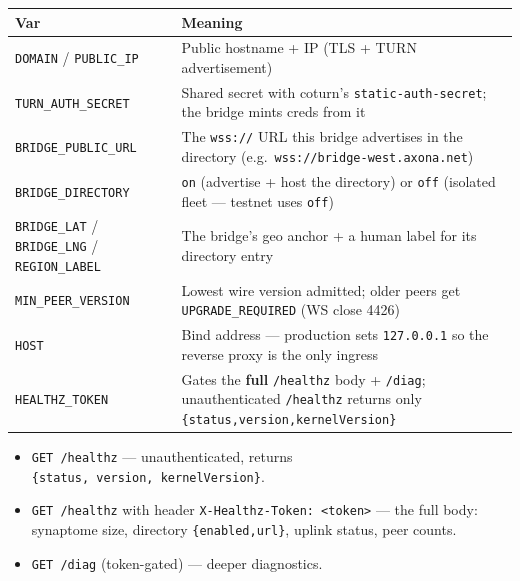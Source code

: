 \documentclass[
  nobib]{tufte-handout}
\newcounter{none} %
\providecommand{\tightlist}{%
  \setlength{\itemsep}{0pt}\setlength{\parskip}{0pt}}
\renewcommand{\subsubsection}[1]{\medskip\par\noindent{\normalsize\bfseries #1}\par\nobreak\smallskip}
\begin{document}
{\def\LTcaptype{none} %
\begin{longtable}[]{@{}
  >{\raggedright\arraybackslash}p{}
  >{\raggedright\arraybackslash}p{}@{}}
\toprule\noalign{}
\begin{minipage}[b]{\linewidth}\raggedright
Var
\end{minipage} & \begin{minipage}[b]{\linewidth}\raggedright
Meaning
\end{minipage} \\
\midrule\noalign{}
\endhead
\bottomrule\noalign{}
\endlastfoot
\texttt{DOMAIN} / \texttt{PUBLIC\_IP} & Public hostname + IP (TLS + TURN
advertisement) \\
\texttt{TURN\_AUTH\_SECRET} & Shared secret with coturn's
\texttt{static-auth-secret}; the bridge mints creds from it \\
\texttt{BRIDGE\_PUBLIC\_URL} & The \texttt{wss://} URL this bridge
advertises in the directory
(e.g.~\texttt{wss://bridge-west.axona.net}) \\
\texttt{BRIDGE\_DIRECTORY} & \texttt{on} (advertise + host the
directory) or \texttt{off} (isolated fleet --- testnet uses
\texttt{off}) \\
\texttt{BRIDGE\_LAT} / \texttt{BRIDGE\_LNG} / \texttt{REGION\_LABEL} &
The bridge's geo anchor + a human label for its directory entry \\
\texttt{MIN\_PEER\_VERSION} & Lowest wire version admitted; older peers
get \texttt{UPGRADE\_REQUIRED} (WS close 4426) \\
\texttt{HOST} & Bind address --- production sets \texttt{127.0.0.1} so
the reverse proxy is the only ingress \\
\texttt{HEALTHZ\_TOKEN} & Gates the \textbf{full} \texttt{/healthz} body
+ \texttt{/diag}; unauthenticated \texttt{/healthz} returns only
\texttt{\{status,version,kernelVersion\}} \\
\end{longtable}
}

\subsubsection{Health \& introspection}\label{health-introspection}

\begin{itemize}
\tightlist
\item
  \texttt{GET\ /healthz} --- unauthenticated, returns
  \texttt{\{status,\ version,\ kernelVersion\}}.
\item
  \texttt{GET\ /healthz} with header
  \texttt{X-Healthz-Token:\ \textless{}token\textgreater{}} --- the full
  body: synaptome size, directory \texttt{\{enabled,url\}}, uplink
  status, peer counts.
\item
  \texttt{GET\ /diag} (token-gated) --- deeper diagnostics.
\end{itemize}
\end{document}
